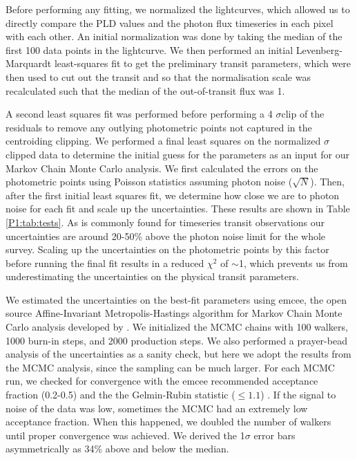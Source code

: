 Before performing any fitting, we normalized the lightcurves, which allowed us to directly compare the PLD values and the photon flux timeseries in each pixel with each other. An initial normalization was done by taking the median of the first 100 data points in the lightcurve. We then performed an initial Levenberg-Marquardt least-squares fit to get the preliminary transit parameters, which were then used to cut out the transit and so that the normalisation scale was recalculated such that the median of the out-of-transit flux was 1.

A second least squares fit was performed before performing a 4 $\sigma$clip of the residuals to remove any outlying photometric points not captured in the centroiding clipping. We performed a final least squares on the normalized $\sigma$clipped data to determine the initial guess for the parameters as an input for our Markov Chain Monte Carlo analysis. We first calculated the errors on the photometric points using Poisson statistics assuming photon noise ($\sqrt{N}$). Then, after the first initial least squares fit, we determine how close we are to photon noise for each fit and scale up the uncertainties. These results are shown in Table \ref{P1:tab:tests}. As is commonly found for \spitzer timeseries transit observations our uncertainties are around 20-50\% above the photon noise limit for the whole survey. Scaling up the uncertainties on the photometric points by this factor before running the final fit results in a reduced $\chi^2$ of $\sim$1, which prevents us from underestimating the uncertainties on the physical transit parameters.

We estimated the uncertainties on the best-fit parameters using emcee, the open source Affine-Invariant Metropolis-Hastings algorithm for Markov Chain Monte Carlo analysis developed by \citet{Foreman-Mackey2013}. We initialized the MCMC chains with 100 walkers, 1000 burn-in steps, and 2000 production steps. We also performed a prayer-bead analysis of the uncertainties as a sanity check, but here we adopt the results from the MCMC analysis, since the sampling can be much larger. For each MCMC run, we checked for convergence with the emcee recommended acceptance fraction (0.2-0.5) and the the Gelmin-Rubin statistic ($\leq1.1$) \citep{Gelman1992}. If the signal to noise of the data was low, sometimes the MCMC had an extremely low acceptance fraction. When this happened, we doubled the number of walkers until proper convergence was achieved. We derived the 1$\sigma$ error bars asymmetrically as 34\% above and below the median.

